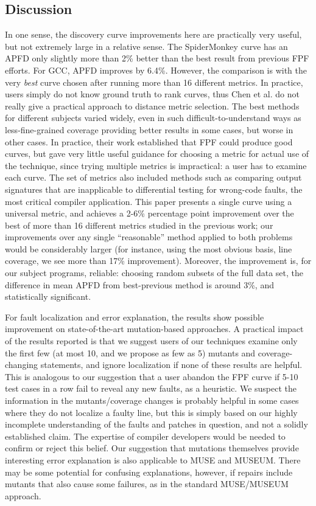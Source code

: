 

\subsection{Discussion}

In one sense, the discovery curve improvements here are practically very useful, but not extremely large in a relative sense.  The SpiderMonkey curve has an APFD only slightly more than 2\% better than the best result from previous FPF efforts.  For GCC, APFD improves by 6.4\%.  However, the comparison is with the very \emph{best} curve chosen after running more than 16 different metrics.  In practice, users simply do not know ground truth to rank curves, thus Chen et al. \cite{PLDI13} do not really give a practical approach to distance metric selection.  The best methods for different subjects varied widely, even in such difficult-to-understand ways as less-fine-grained coverage providing better results in some cases, but worse in other cases.   In practice, their work established that FPF could produce good curves, but gave very little useful guidance for choosing a metric for actual use of the technique, since trying multiple metrics is impractical: a user has to examine each curve.  The set of metrics also included methods such as comparing output signatures that are inapplicable to differential testing for wrong-code faults, the most critical compiler application.  This paper presents a single curve using a universal metric, and achieves a 2-6\% percentage point improvement over the best of more than 16 different metrics studied in the previous work; our improvements over any single ``reasonable'' method applied to both problems would be considerably larger (for instance, using the most obvious basis, line coverage, we see more than 17\% improvement).  Moreover, the improvement is, for our subject programs, reliable:  choosing random subsets of the full data set, the difference in mean APFD from best-previous method is around 3\%, and statistically significant.

For fault localization and error explanation, the results show possible improvement on state-of-the-art mutation-based approaches.  A practical impact of the results reported is that we suggest users of our techniques examine only the first few (at most 10, and we propose as few as 5) mutants and coverage-changing statements, and ignore localization if none of these results are helpful.  This is analogous to our suggestion that a user abandon the FPF curve if 5-10 test cases in a row fail to reveal any new faults, as a heuristic.  We suspect the information in the mutants/coverage changes is probably helpful in some cases where they do not localize a faulty line, but this is simply based on our highly incomplete understanding of the faults and patches in question, and not a solidly established claim.  The expertise of compiler developers would be needed to confirm or reject this belief.  Our suggestion that mutations themselves provide interesting error explanation is also applicable to MUSE and MUSEUM.  There may be some potential for confusing explanations, however, if repairs include mutants that also cause some failures, as in the standard MUSE/MUSEUM approach.  

